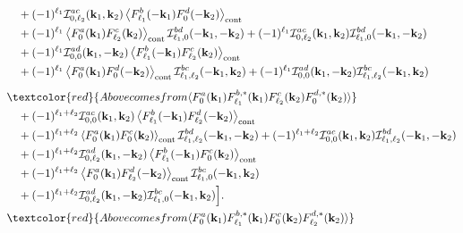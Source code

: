 \documentclass[a4paper,11pt]{article}
\begin{document}
\begin{align}
&\quad
+
(-1)^{\ell_1}
\mathcal{I}^{ac}_{0,\ell_2}(\mathbf{k}_1,\mathbf{k}_2)
\left\langle
F^b_{\ell_1}(-\mathbf{k}_1)F^d_0(-\mathbf{k}_2)
\right\rangle_{\mathrm{cont}}
\nonumber\\
&\quad
+
(-1)^{\ell_1}
\left\langle
F^a_0(\mathbf{k}_1)F^c_{\ell_2}(\mathbf{k}_2)
\right\rangle_{\mathrm{cont}}
\mathcal{I}^{bd}_{\ell_1,0}(-\mathbf{k}_1,-\mathbf{k}_2)
+
(-1)^{\ell_1}
\mathcal{I}^{ac}_{0,\ell_2}(\mathbf{k}_1,\mathbf{k}_2)
\mathcal{I}^{bd}_{\ell_1,0}(-\mathbf{k}_1,-\mathbf{k}_2)
\nonumber\\
&\quad
+
(-1)^{\ell_1}
\mathcal{I}^{ad}_{0,0}(\mathbf{k}_1,-\mathbf{k}_2)
\left\langle
F^b_{\ell_1}(-\mathbf{k}_1)F^c_{\ell_2}(\mathbf{k}_2)
\right\rangle_{\mathrm{cont}}
\nonumber\\
&\quad
+
(-1)^{\ell_1}
\left\langle
F^a_0(\mathbf{k}_1)F^d_0(-\mathbf{k}_2)
\right\rangle_{\mathrm{cont}}
\mathcal{I}^{bc}_{\ell_1,\ell_2}(-\mathbf{k}_1,\mathbf{k}_2)
+
(-1)^{\ell_1}
\mathcal{I}^{ad}_{0,0}(\mathbf{k}_1,-\mathbf{k}_2)
\mathcal{I}^{bc}_{\ell_1,\ell_2}(-\mathbf{k}_1,\mathbf{k}_2)
\nonumber\\[0.5em]
& \textcolor{red}{Above comes from \langle F^a_{0}(\mathbf k_1)F^{b,*}_{\ell_1}(\mathbf k_1)F^c_{\ell_2}(\mathbf k_2)F^{d,*}_{0}(\mathbf k_2)\rangle} \nonumber\\
&\quad
+
(-1)^{\ell_1+\ell_2}
\mathcal{I}^{ac}_{0,0}(\mathbf{k}_1,\mathbf{k}_2)
\left\langle
F^b_{\ell_1}(-\mathbf{k}_1)F^d_{\ell_2}(-\mathbf{k}_2)
\right\rangle_{\mathrm{cont}}
\nonumber\\
&\quad
+
(-1)^{\ell_1+\ell_2}
\left\langle
F^a_0(\mathbf{k}_1)F^c_0(\mathbf{k}_2)
\right\rangle_{\mathrm{cont}}
\mathcal{I}^{bd}_{\ell_1,\ell_2}(-\mathbf{k}_1,-\mathbf{k}_2)
+
(-1)^{\ell_1+\ell_2}
\mathcal{I}^{ac}_{0,0}(\mathbf{k}_1,\mathbf{k}_2)
\mathcal{I}^{bd}_{\ell_1,\ell_2}(-\mathbf{k}_1,-\mathbf{k}_2)
\nonumber\\
&\quad
+
(-1)^{\ell_1+\ell_2}
\mathcal{I}^{ad}_{0,\ell_2}(\mathbf{k}_1,-\mathbf{k}_2)
\left\langle
F^b_{\ell_1}(-\mathbf{k}_1)F^c_0(\mathbf{k}_2)
\right\rangle_{\mathrm{cont}}
\nonumber\\
&\quad
+
(-1)^{\ell_1+\ell_2}
\left\langle
F^a_0(\mathbf{k}_1)F^d_{\ell_2}(-\mathbf{k}_2)
\right\rangle_{\mathrm{cont}}
\mathcal{I}^{bc}_{\ell_1,0}(-\mathbf{k}_1,\mathbf{k}_2)
\nonumber\\
&\quad
+
(-1)^{\ell_1+\ell_2}
\mathcal{I}^{ad}_{0,\ell_2}(\mathbf{k}_1,-\mathbf{k}_2)
\mathcal{I}^{bc}_{\ell_1,0}(-\mathbf{k}_1,\mathbf{k}_2)
\Big] . \nonumber\\
& \textcolor{red}{Above comes from \langle F^a_{0}(\mathbf k_1)F^{b,*}_{\ell_1}(\mathbf k_1)F^c_{0}(\mathbf k_2)F^{d,*}_{\ell_2}(\mathbf k_2)\rangle}
\end{align}
\end{document}
